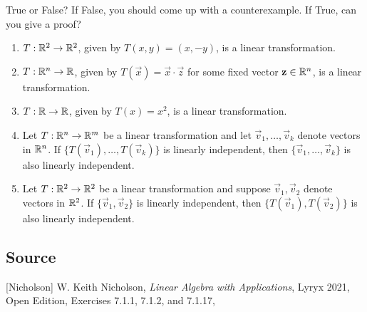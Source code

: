 \documentclass{ximera}
\author{}
\begin{document}
\begin{exercise}

True or False?  If False, you should come up with a counterexample.  If True, can you give a proof?

 \begin{enumerate}
 \item $T : \mathbb{R}^2 \to \mathbb{R}^2$, given by $T(x, y) = (x, -y)$, is a linear transformation.

 \begin{multipleChoice}
 \end{multipleChoice}

 \item $T : \mathbb{R}^n \to \mathbb{R}$, given by $T(\vec{x}) = \vec{x} \cdot \vec{z}$ for some fixed vector $\mathbf{z} \in \mathbb{R}^n$, is a linear transformation.

 \begin{multipleChoice}
 \end{multipleChoice}

\item $T : \mathbb{R} \to \mathbb{R}$, given by $T(x) = x^2$, is a linear transformation.

 \begin{multipleChoice}
 \end{multipleChoice}

 \item Let $T : \mathbb{R}^n \to \mathbb{R}^m$ be a linear transformation and let $\vec{v}_{1}, \dots, \vec{v}_{k}$ denote vectors in $\mathbb{R}^n$.  If $\{T(\vec{v}_{1}), \dots, T(\vec{v}_{k})\}$ is linearly independent, then $\{\vec{v}_{1}, \dots, \vec{v}_{k}\}$ is also linearly independent.

 \begin{multipleChoice}
 \end{multipleChoice}

 \item Let $T : \mathbb{R}^2 \to \mathbb{R}^2$ be a linear transformation and suppose $\vec{v}_{1}, \vec{v}_{2}$ denote vectors in $\mathbb{R}^2$.  If $\{\vec{v}_{1}, \vec{v}_{2}\}$ is linearly independent, then $\{T(\vec{v}_{1}), T(\vec{v}_{2})\}$ is also linearly independent.

 \begin{multipleChoice}
 \end{multipleChoice}
 \end{enumerate}

 
\end{exercise}

\subsection*{Source}
[Nicholson] W. Keith Nicholson, {\it Linear Algebra with Applications}, Lyryx 2021, Open Edition, Exercises 7.1.1, 7.1.2, and 7.1.17, 
\end{document}
